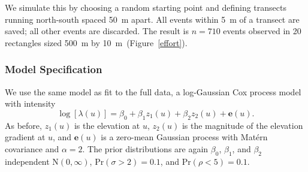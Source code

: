 \documentclass[]{interact}
\begin{document}
We simulate this by choosing a random starting point and defining transects
running north-south spaced 50~m apart. All events within 5~m of a transect are
saved; all other events are discarded. The result is \(n = 710\) events
observed in 20 rectangles sized 500~m by 10~m~(Figure~\ref{effort}).


\subsubsection{Model Specification}
\label{xsectmodel}

We use the same model as fit to the full data, a log-Gaussian Cox process model
with intensity
\begin{equation}
\log\left[\lambda(u)\right] = \beta_{0} + \beta_{1} z_{1}(u)
+ \beta_{2} z_{2}(u) + \mathbf{e}(u).
\end{equation}
As before, \(z_{1}(u)\) is the elevation at \(u\), \(z_{2}(u)\) is the
magnitude of the elevation gradient at \(u\), and \(\mathbf{e}(u)\) is a
zero-mean Gaussian process with Mat\'{e}rn covariance and \(\alpha = 2\).
The prior distributions are again \(\beta_{0}\), \(\beta_{1}\), and
\(\beta_{2}\) independent \(\mathrm{N}(0, \infty)\),
\(\mathrm{Pr}(\sigma > 2) = 0.1\), and \(\mathrm{Pr}(\rho < 5) = 0.1\).
\end{document}
